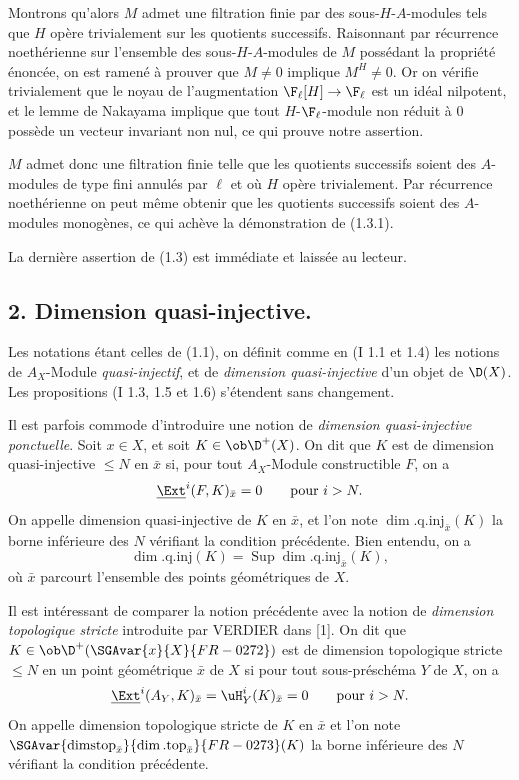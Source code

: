 Montrons qu'alors $M$ admet une filtration finie par des sous-$H$-$A$-modules tels que $H$ opère trivialement sur les quotients successifs. Raisonnant par récurrence noethérienne sur l'ensemble des sous-$H$-$A$-modules de $M$ possédant la propriété énoncée, on est ramené à prouver que $M\neq0$ implique $M^H\neq0$. Or on vérifie trivialement que le noyau de l'augmentation $\F_\ell[H]\to\F_\ell$ est un idéal nilpotent, et le lemme de Nakayama implique que tout $H$-$\F_\ell$-module non réduit à $0$ possède un vecteur invariant non nul, ce qui prouve notre assertion.

$M$ admet donc une filtration finie telle que les quotients successifs soient des $A$-modules de type fini annulés par $\ell$ et où $H$ opère trivialement. Par récurrence noethérienne on peut même obtenir que les quotients successifs soient des $A$-modules monogènes, ce qui achève la démonstration de (1.3.1).

La dernière assertion de (1.3) est immédiate et laissée au lecteur.

\subsection*{2. Dimension quasi-injective.}

Les notations étant celles de (1.1), on définit comme en (I 1.1 et 1.4) les notions de $A_X$-Module \emph{quasi-injectif}, et de \emph{dimension quasi-injective} d'un objet de $\D(X)$. Les propositions (I 1.3, 1.5 et 1.6) s'étendent sans changement.

Il est parfois commode d'introduire une notion de \emph{dimension quasi-injective ponctuelle}. Soit $x\in X$, et soit $K\in\ob \D^+(X)$. On dit que $K$ est de dimension quasi-injective $\leq N$ en $\bar{x}$ si, pour tout $A_X$-Module constructible $F$, on a
\[
        \underline{\Ext}^{i}(F,K)_{\bar{x}}=0\qquad\hbox{pour }i>N.
\]
On appelle dimension quasi-injective de $K$ en $\bar{x}$, et l'on note $\dim.\mathrm{q.inj}_{\bar{x}}(K)$ la borne inférieure des $N$ vérifiant la condition précédente. Bien entendu, on a
\[
        \dim.\mathrm{q.inj}(K)=\operatorname{Sup}\dim.\mathrm{q.inj}_{\bar{x}}(K),
\]
où $\bar{x}$ parcourt l'ensemble des points géométriques de $X$.

Il est intéressant de comparer la notion précédente avec la notion de \emph{dimension topologique stricte} introduite par VERDIER dans [1]. On dit que $K\in\ob \D^+(\SGAvar{x}{X}{FR-0272})$ est de dimension topologique stricte $\leq N$ en un point géométrique $\bar{x}$ de $X$ si pour tout sous-préschéma $Y$ de $X$, on a
\[
        \underline{\Ext}^{i}(A_Y,K)_{\bar{x}}=\uH^i_Y(K)_{\bar{x}}=0\qquad\hbox{pour }i>N.
\]
On appelle dimension topologique stricte de $K$ en $\bar{x}$ et l'on note $\SGAvar{\operatorname{dimstop}_{\bar{x}}}{\dim.\mathrm{top}_{\bar{x}}}{FR-0273}(K)$ la borne inférieure des $N$ vérifiant la condition précédente.

